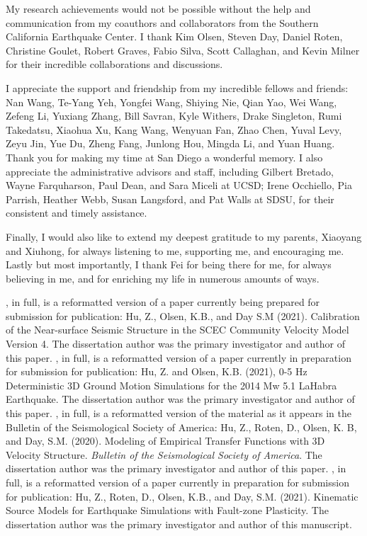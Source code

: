 \begin{frontmatter}
\begin{acknowledgements}
        My research achievements would not be possible without the help and communication from my coauthors and collaborators from the Southern California Earthquake Center. I thank Kim Olsen, Steven Day, Daniel Roten, Christine Goulet, Robert Graves, Fabio Silva, Scott Callaghan, and Kevin Milner for their incredible collaborations and discussions.

        I appreciate the support and friendship from my incredible fellows and friends: Nan Wang, Te-Yang Yeh, Yongfei Wang, Shiying Nie, Qian Yao, Wei Wang, Zefeng Li, Yuxiang Zhang, Bill Savran, Kyle Withers, Drake Singleton, Rumi Takedatsu, Xiaohua Xu, Kang Wang, Wenyuan Fan, Zhao Chen, Yuval Levy, Zeyu Jin, Yue Du, Zheng Fang, Junlong Hou, Mingda Li, and Yuan Huang. Thank you for making my time at San Diego a wonderful memory. I also appreciate the administrative advisors and staff, including Gilbert Bretado, Wayne Farquharson, Paul Dean, and Sara Miceli at UCSD; Irene Occhiello, Pia Parrish, Heather Webb, Susan Langsford, and Pat Walls at SDSU, for their consistent and timely assistance.

        Finally, I would also like to extend my deepest gratitude to my parents, Xiaoyang and Xiuhong, for always listening to me, supporting me, and encouraging me. Lastly but most importantly, I thank Fei for being there for me, for always believing in me, and for enriching my life in numerous amounts of ways.

        \bigskip


        , in full, is a reformatted version of a paper currently being prepared for submission for publication: Hu, Z., Olsen, K.B., and Day S.M (2021). Calibration of the Near-surface Seismic Structure in the SCEC Community Velocity Model Version 4.
        The dissertation author was the primary investigator and author of this paper.
        , in full, is a reformatted version of a paper currently in preparation for submission for publication: Hu, Z. and Olsen, K.B. (2021), 0-5 Hz Deterministic 3D Ground Motion Simulations for the 2014 Mw 5.1 LaHabra Earthquake. The dissertation author was the primary investigator and author of this paper.
        , in full, is a reformatted version of the material as it appears in the Bulletin of the Seismological Society of America: Hu, Z., Roten, D., Olsen, K. B, and Day, S.M. (2020). Modeling of Empirical Transfer Functions with 3D Velocity Structure. \emph{Bulletin of the Seismological Society of America}.
        The dissertation author was the primary investigator and author of this paper.
        , in full, is a reformatted version of a paper currently in preparation for submission for publication: Hu, Z., Roten, D., Olsen, K.B., and Day, S.M. (2021). Kinematic Source Models for Earthquake Simulations with Fault-zone Plasticity. The dissertation author was the primary investigator and author of this manuscript.



\end{acknowledgements}
\end{frontmatter}
